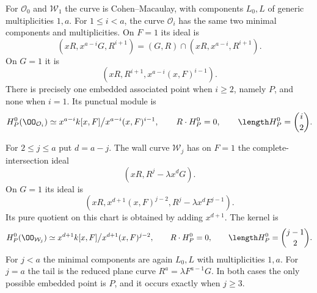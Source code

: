\begin{theorem}\label{thm:punctual-v169}
For $\mathcal O_0$ and $\mathcal W_1$ the curve is Cohen--Macaulay,
with components $L_0,L$ of generic multiplicities $1,a$.
For $1\leq i<a$, the curve $\mathcal O_i$ has the same two minimal
components and multiplicities. On $F=1$ its ideal is
\begin{equation}\label{eq:Oi-F-v169}
 (xR,x^{a-i}G,R^{i+1})
    =(G,R)\cap(xR,x^{a-i},R^{i+1}).
\end{equation}
On $G=1$ it is
\begin{equation}\label{eq:Oi-G-v169}
 (xR,R^{i+1},x^{a-i}(x,F)^{i-1}).
\end{equation}
There is precisely one embedded associated point when $i\geq2$, namely
$P$, and none when $i=1$. Its punctual module is
\begin{equation}\label{eq:Oi-torsion-v169}
 H^0_P(\OO_{\mathcal O_i})
   \simeq x^{a-i}k[x,F]\big/x^{a-i}(x,F)^{i-1},\qquad R\cdot H^0_P=0,
 \qquad\length H^0_P=\binom i2.
\end{equation}

For $2\leq j\leq a$ put $d=a-j$. The wall curve $\mathcal W_j$ has
on $F=1$ the complete-intersection ideal
\begin{equation}\label{eq:W-F-v169}
 (xR,R^j-\lambda x^dG).
\end{equation}
On $G=1$ its ideal is
\begin{equation}\label{eq:W-G-v169}
 (xR,x^{d+1}(x,F)^{j-2},R^j-\lambda x^dF^{j-1}).
\end{equation}
Its pure quotient on this chart is obtained by adding $x^{d+1}$.
The kernel is
\begin{equation}\label{eq:W-torsion-v169}
 H^0_P(\OO_{\mathcal W_j})
  \simeq x^{d+1}k[x,F]\big/x^{d+1}(x,F)^{j-2},\qquad R\cdot H^0_P=0,
 \qquad\length H^0_P=\binom{j-1}{2}.
\end{equation}
For $j<a$ the minimal components are again $L_0,L$ with multiplicities
$1,a$. For $j=a$ the tail is the reduced plane curve
$R^a=\lambda F^{a-1}G$. In both cases the only possible embedded point
is $P$, and it occurs exactly when $j\geq3$.
\end{theorem}
